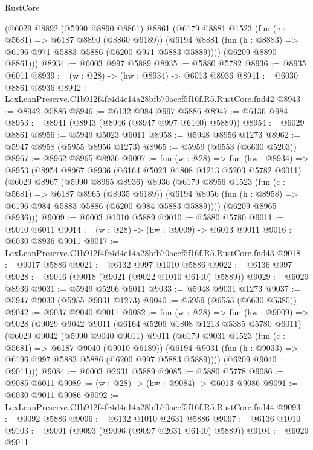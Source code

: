 \begin{lexlean}{RustCore}
\begin{coremodule}
      (@6029
        @8892
        (@5990 @8890 @8861)
        @8861
        (@6179
          @8881
          @1523
          (fun (c : @5681) => @6187 @8890 (@8860 @6189))
          (@6194 @8881 (fun (h : @8883) => @6196 @971 @5883 @5886 (@6200 @971 @5883 @5889))))
        (@6209 @8890 @8861)))
@8934 := @6003 @997 @5889
@8935 := @5880 @5782
@8936 := @8935 @6011
@8939 := (w : @28) -> (hw : @8934) -> @6013 @8936
@8941 := @6030 @8861 @8936
@8942 := LexLeanPreserve.C1b912f4fc4d4e14a28bfb70aeef5f16f.R5.RustCore.fnd42
@8943 := @8942 @5886
@8946 := @6132 @984 @997 @5886
@8947 := @6136 @984
@8953 := @8941 (@8943 (@8946 (@8947 @997 @6140) @5889))
@8954 := @6029 @8861
@8956 := @5949 @5023 @6011
@8958 := @5948 @8956 @1273
@8962 := @5947 @8958 (@5955 @8956 @1273)
@8965 := @5959 (@6553 (@6630 @5203))
@8967 := @8962 @8965 @8936
@9007 := fun (w : @28) =>
  fun (hw : @8934) =>
  @8953
    (@8954
      @8967
      @8936
      (@6164 @5023 @1808 @1213 @5203 @5782 @6011)
      (@6029
        @8967
        (@5990 @8965 @8936)
        @8936
        (@6179
          @8956
          @1523
          (fun (c : @5681) => @6187 @8965 (@8935 @6189))
          (@6194 @8956 (fun (h : @8958) => @6196 @984 @5883 @5886 (@6200 @984 @5883 @5889))))
        (@6209 @8965 @8936)))
@9009 := @6003 @1010 @5889
@9010 := @5880 @5780
@9011 := @9010 @6011
@9014 := (w : @28) -> (hw : @9009) -> @6013 @9011
@9016 := @6030 @8936 @9011
@9017 := LexLeanPreserve.C1b912f4fc4d4e14a28bfb70aeef5f16f.R5.RustCore.fnd43
@9018 := @9017 @5886
@9021 := @6132 @997 @1010 @5886
@9022 := @6136 @997
@9028 := @9016 (@9018 (@9021 (@9022 @1010 @6140) @5889))
@9029 := @6029 @8936
@9031 := @5949 @5206 @6011
@9033 := @5948 @9031 @1273
@9037 := @5947 @9033 (@5955 @9031 @1273)
@9040 := @5959 (@6553 (@6630 @5385))
@9042 := @9037 @9040 @9011
@9082 := fun (w : @28) =>
  fun (hw : @9009) =>
  @9028
    (@9029
      @9042
      @9011
      (@6164 @5206 @1808 @1213 @5385 @5780 @6011)
      (@6029
        @9042
        (@5990 @9040 @9011)
        @9011
        (@6179
          @9031
          @1523
          (fun (c : @5681) => @6187 @9040 (@9010 @6189))
          (@6194 @9031 (fun (h : @9033) => @6196 @997 @5883 @5886 (@6200 @997 @5883 @5889))))
        (@6209 @9040 @9011)))
@9084 := @6003 @2631 @5889
@9085 := @5880 @5778
@9086 := @9085 @6011
@9089 := (w : @28) -> (hw : @9084) -> @6013 @9086
@9091 := @6030 @9011 @9086
@9092 := LexLeanPreserve.C1b912f4fc4d4e14a28bfb70aeef5f16f.R5.RustCore.fnd44
@9093 := @9092 @5886
@9096 := @6132 @1010 @2631 @5886
@9097 := @6136 @1010
@9103 := @9091 (@9093 (@9096 (@9097 @2631 @6140) @5889))
@9104 := @6029 @9011

\end{coremodule}
\end{lexlean}
